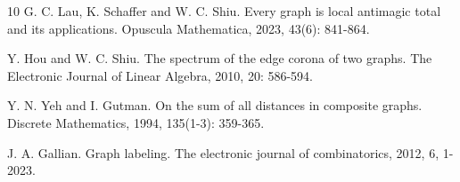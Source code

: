 \documentclass[12pt]{article}
\begin{document}
\begin{thebibliography}{10}
 G. C. Lau, K. Schaffer and W. C. Shiu. Every graph is local antimagic total and its applications. Opuscula Mathematica, 2023, 43(6): 841-864.

 Y. Hou and W. C. Shiu. The spectrum of the edge corona of two graphs. The Electronic Journal of Linear Algebra, 2010, 20: 586-594.

 Y. N. Yeh and I. Gutman. On the sum of all distances in composite graphs. Discrete Mathematics, 1994, 135(1-3): 359-365.

J. A. Gallian. Graph labeling. The electronic journal of combinatorics, 2012, 6, 1-2023.
\end{thebibliography}
\end{document}
